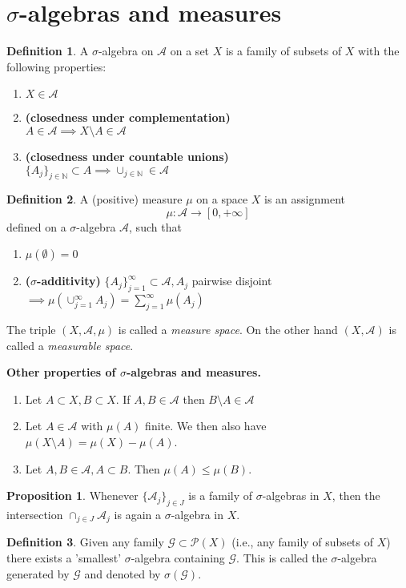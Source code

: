 \documentclass[a4paper,14pt]{extarticle}
\theoremstyle{definition}
\newtheorem{definition}{Definition}
\newtheorem{proposition}{Proposition}
\begin{document}
\section{$\sigma$-algebras and measures}
\begin{definition}
  A $\sigma$-algebra on $\mathcal{A}$ on a set 
  $X$ is a family of subsets of $X$ with 
  the following properties:
  \begin{enumerate}
    \item $X\in\mathcal{A}$
    \item \textbf{(closedness under complementation)}\\ $A\in\mathcal{A}\implies X\setminus A\in\mathcal{A}$
    \item \textbf{(closedness under countable unions)}\\ $\{A_j\}_{j\in\mathbb{N}}\subset A\implies
    \cup_{j\in\mathbb{N}}\in\mathcal{A}$
  \end{enumerate}
\end{definition}
\begin{definition}
  A (positive) measure $\mu$ on a space $X$ is 
  an assignment \[\mu:\mathcal{A}\rightarrow[0,+\infty]\]
  defined on a $\sigma$-algebra $\mathcal{A}$,
  such that 
  \begin{enumerate}
    \item $\mu(\emptyset)=0$
    \item \textbf{($\sigma$-additivity)} $\{A_j\}_{j=1}^\infty\subset\mathcal{A}, A_j$ pairwise disjoint $\implies \mu(\cup_{j=1}^\infty A_j)=
    \sum_{j=1}^\infty \mu(A_j)$
  \end{enumerate}
  The triple $(X,\mathcal{A},\mu)$ is called a 
  \textit{measure space}. On the other hand 
  $(X,\mathcal{A})$ is called a \textit{measurable space}.
\end{definition}
\textbf{Other properties of $\sigma$-algebras and measures.}
\begin{enumerate}
  \item Let $A\subset X,B\subset X$. If $A,B\in\mathcal{A}$ then $B\setminus A\in\mathcal{A}$
  \item Let $A\in\mathcal{A}$ with $\mu(A)$ finite. We then also have $\mu(X\setminus A)=\mu(X)-\mu(A)$.
  \item Let $A,B\in\mathcal{A}, A\subset B$. Then 
  $\mu(A)\leq \mu(B)$.
\end{enumerate}
\begin{proposition}
  Whenever $\{\mathcal{A}_j\}_{j\in J}$ is a family of $\sigma$-algebras in $X$, then the intersection
  $\cap_{j\in J}\mathcal{A}_j$ is again a 
  $\sigma$-algebra in $X$.
\end{proposition}
\begin{definition}
  Given any family $\mathcal{G}\subset\mathcal{P}(X)$ (i.e., any family of subsets of $X$) there exists a 'smallest' $\sigma$-algebra containing 
  $\mathcal{G}$. This is called the $\sigma$-algebra
  generated by $\mathcal{G}$ and denoted by $\sigma(\mathcal{G})$.
\end{definition}
\newpage
\end{document}
